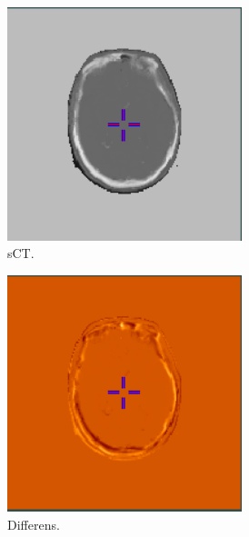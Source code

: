 \begin{figure}[H]
\begin{subfigure}[b]{0.3\textwidth}
        \includegraphics[width=0.75\textwidth]{colager/loocv_ct/loocv_010769_sct.png}
        \caption{sCT.}
        \label{col:loocv_ct_pat2_sct}
    \end{subfigure}\hfill
    \begin{subfigure}[b]{0.3\textwidth}
        \centering
        \includegraphics[width=0.75\textwidth]{colager/loocv_ct/loocv_010769_sub.png}
        \caption{Differens.}
        \label{col:loocv_ct_pat2_sub}
    \end{subfigure}\\
    \begin{subfigure}[b]{0.3\textwidth}
        \centering

\end{subfigure}
\end{figure}
